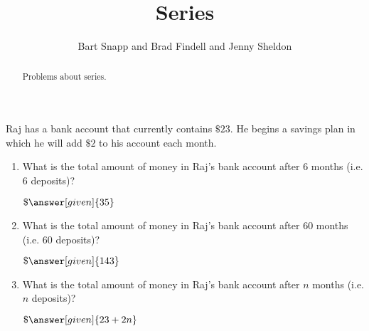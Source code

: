 \documentclass[nooutcomes]{ximera}
\title{Series}
\author{Bart Snapp and Brad Findell and Jenny Sheldon}
\begin{document}
\begin{abstract}
Problems about series.
\end{abstract}
\maketitle




\begin{problem}
Raj has a bank account that currently contains $\$23$.  He begins a savings plan in which he will add $\$2$ to his account each month.  

\begin{enumerate}
\item What is the total amount of money in Raj's bank account after $6$ months (i.e. $6$ deposits)? \begin{prompt} $\$\answer[given]{35}$\end{prompt}
\item What is the total amount of money in Raj's bank account after $60$ months (i.e. $60$ deposits)? \begin{prompt} $\$\answer[given]{143}$\end{prompt}
\item What is the total amount of money in Raj's bank account after $n$ months (i.e. $n$ deposits)? \begin{prompt} $\$\answer[given]{23+2n}$ \end{prompt}
\end{enumerate}
\end{problem}
\end{document}
